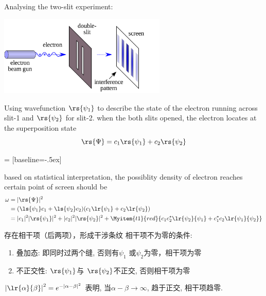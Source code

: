 \begin{frame}
    Analysing the two-slit experiment:
      \begin{center}
           \includegraphics[width=0.6\textwidth]{figs/Etwoslitexp.png}
      \end{center}
    \begin{itemize}
        \Item Using wavefunction $\rs{\psi_1}$ to describe the state of the electron running across slit-1 and $\rs{\psi_2}$ for slit-2. when the both slits opened, the electron locates at the superposition state
            \[ \rs{\Psi}=c_1 \rs{\psi_1}+ c_2\rs{\psi_2} \]
    \end{itemize}
\end{frame}

\begin{frame}
     = [baseline=-.5ex]
    \begin{itemize}
        \Item based on statistical interpretation, the possiblity density of electron reaches certain point of screen should be
        \begin{equation*}
        \begin{split}
            \omega &=|\rs{\Psi}|^2 \\
            &= (\ls{\psi_1}c_1 + \ls{\psi_2}c_2 ) (c_1 \lr{\psi_1}+ c_2\lr{\psi_2}) \\
            & = |c_1|^2 |\rs{\psi_1}|^2 + |c_2|^2 |\rs{\psi_2}|^2  
            + \Myitem{t1}{red}{c_1 c_2 ^* \lr{\psi_2}{\psi_1} + c_1 ^* c_2 \lr{\psi_1}{\psi_2} } \\
        \end{split} 
        \end{equation*}
    \end{itemize}
    \begin{itemize}
        \Item 存在相干项（后两项），形成干涉条纹
        \Item 相干项不为零的条件: 
        \begin{enumerate}
            \item 叠加态: 即同时过两个缝, 否则有$\psi_1$ 或$\psi_2$为零，相干项为零
            \item 不正交性: $\rs{\psi_1}$与 $\rs{\psi_2}$不正交, 否则相干项为零
        \end{enumerate}
        \Item $\left|\lr{\alpha}{\beta} \right|^2 = e^{-  \left| \alpha - \beta\right|^2}$ 表明, 当$\alpha - \beta \to \infty $, 
        趋于正交, 相干项趋零.
    \end{itemize}
\end{frame}

